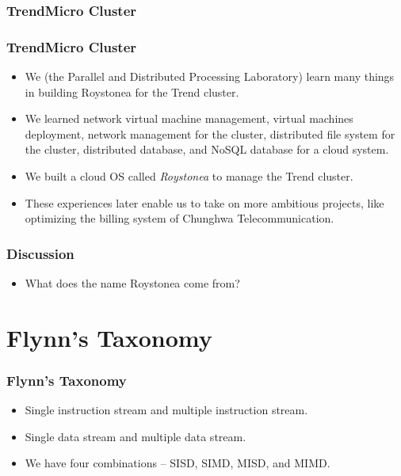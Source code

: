 \documentclass{beamer}
\begin{document}
\begin{CJK}{UTF8}{bsmi}
\begin{frame}
\frametitle{TrendMicro Cluster}
\centerline{}
\end{frame}

\begin{frame}
\frametitle{TrendMicro Cluster}
\centerline{}
\end{frame}

\begin{frame}
\begin{itemize}
\item We (the Parallel and Distributed Processing Laboratory) learn
  many things in building Roystonea for the Trend cluster.
\item We learned network virtual machine management, virtual machines deployment, network management for the cluster, distributed file system for the cluster, distributed database, and NoSQL database for a cloud system.
\item We built a cloud OS called {\em Roystonea} to manage the Trend cluster.
\item These experiences later enable us to take on more ambitious projects, like optimizing the billing system of Chunghwa Telecommunication.
\end{itemize}
\end{frame}


\begin{frame}
\frametitle{Discussion}
\begin{itemize}
\item What does the name Roystonea come from?
\end{itemize}
\end{frame}

\section{Flynn's Taxonomy}

\begin{frame}
\frametitle{Flynn's Taxonomy}
\begin{itemize}
\item Single instruction stream and multiple instruction stream.
\item Single data stream and multiple data stream.
\item We have four combinations -- SISD, SIMD, MISD, and MIMD.
\end{itemize}
\end{frame}


\end{CJK}
\end{document}
